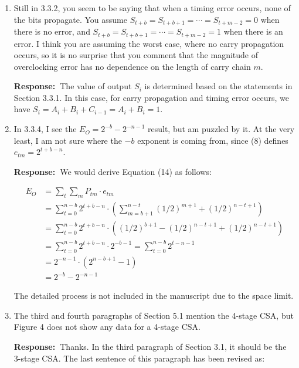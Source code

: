\documentclass[a4paper, 11pt]{article}
\def\Response{\noindent \textbf{Response:~}}
\newcommand{\Question}[1]{\textcolor[rgb]{0.51,0.00,0.00}{#1}}
\begin{document}
\begin{enumerate}
  \item \Question{Still in 3.3.2, you seem to be saying that when a timing error occurs, none of the bits propagate. You assume $S_{t+b}=S_{t+b+1}=\cdots=S_{t+m-2}=0$ when there is no error, and $S_{t+b}=S_{t+b+1}=\cdots=S_{t+m-2}=1$ when there is an error. I think you are assuming the worst case, where no carry propagation occurs, so it is no surprise that you comment that the magnitude of overclocking error has no dependence on the length of carry chain $m$.}
      
      \Response The value of output $S_i$ is determined based on the statements in Section 3.3.1. In this case, for carry propagation and timing error occurs, we have $S_i=A_i+B_i+C_{i-1}=A_i+B_i=1$.\\ 
      
  \item \Question{In 3.3.4, I see the $E_O = 2^{-b}-2^{-n-1}$ result, but am puzzled by it.  At the very least, I am not sure where the $-b$ exponent is coming from, since (8) defines $e_{tm} = 2^{t+b-n}$.}
      
      \Response We would derive Equation (14) as follows:
      
      \begin{align*}
        E_O&=\sum_t\sum_m P_{tm}\cdot e_{tm}\\ &=\sum_{t=0}^{n-b}2^{t+b-n}\cdot\left(\sum_{m=b+1}^{n-t}(1/2)^{m+1}+(1/2)^{n-t+1}\right)\\
        &=\sum_{t=0}^{n-b}2^{t+b-n}\cdot\left((1/2)^{b+1}-(1/2)^{n-t+1}+(1/2)^{n-t+1}\right)\\
        &=\sum_{t=0}^{n-b}2^{t+b-n}\cdot2^{-b-1}=\sum_{t=0}^{n-b}2^{t-n-1}\\
        &=2^{-n-1}\cdot\left(2^{n-b+1}-1\right)\\
        &=2^{-b}-2^{-n-1}
      \end{align*}
      
      The detailed process is not included in the manuscript due to the space limit.\\
      
  \item \Question{The third and fourth paragraphs of Section 5.1 mention the 4-stage CSA, but Figure 4 does not show any data for a 4-stage CSA.}
      
      \Response Thanks. In the third paragraph of Section 3.1, it should be the 3-stage CSA. The last sentence of this paragraph has been revised as:\\
      

\end{enumerate}
\end{document}
